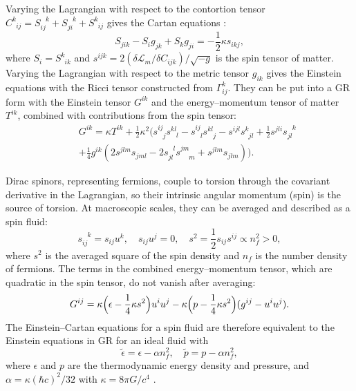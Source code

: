 \documentclass[prd,onecolumn,nofootinbib]{revtex4}
\begin{document}
Varying the Lagrangian with respect to the contortion tensor $C^k_{\phantom{k}ij}=S_{ij}^{\phantom{ij}k}+S_{ji}^{\phantom{ji}k}+S^k_{\phantom{k}ij}$ gives the Cartan equations \cite{EC}:
\[
    S_{jik}-S_i g_{jk}+S_k g_{ji}=-\frac{1}{2}\kappa s_{ikj},
\]
where $S_i=S^k_{\phantom{k}ik}$ and $s^{ijk}=2(\delta\mathcal{L}_m/\delta C_{ijk})/\sqrt{-g}$ is the spin tensor of matter.
Varying the Lagrangian with respect to the metric tensor $g_{ik}$ gives the Einstein equations with the Ricci tensor constructed from $\Gamma^{k}_{ij}$.
They can be put into a GR form with the Einstein tensor $G^{ik}$ and the energy--momentum tensor of matter $T^{ik}$, combined with contributions from the spin tensor:
\begin{eqnarray}
    & & G^{ik}=\kappa T^{ik}+\frac{1}{2}\kappa^2\biggl(s^{ij}_{\phantom{ij}j}s^{kl}_{\phantom{kl}l}-s^{ij}_{\phantom{ij}l}s^{kl}_{\phantom{kl}j}-s^{ijl}s^k_{\phantom{k}jl}+\frac{1}{2}s^{jli}s_{jl}^{\phantom{jl}k} \nonumber \\
    & & +\frac{1}{4}g^{ik}(2s^{jlm}s_{jml}-2s_{jl}^{\phantom{jl}l}s^{jm}_{\phantom{jm}m}+s^{jlm}s_{jlm})\biggr).
    \nonumber
\end{eqnarray}

Dirac spinors, representing fermions, couple to torsion through the covariant derivative in the Lagrangian, so their intrinsic angular momentum (spin) is the source of torsion.
At macroscopic scales, they can be averaged and described as a spin fluid:
\[
    s_{ij}^{\phantom{ij}k}=s_{ij}u^k,\quad s_{ij}u^j=0,\quad s^2=\frac{1}{2}s_{ij}s^{ij}\propto n_f^2>0,
\]
where $s^2$ is the averaged square of the spin density and $n_f$ is the number density of fermions.
The terms in the combined energy--momentum tensor, which are quadratic in the spin tensor, do not vanish after averaging:
\[
    G^{ij}=\kappa\Bigl(\epsilon-\frac{1}{4}\kappa s^2\Bigr)u^i u^j-\kappa\Bigl(p-\frac{1}{4}\kappa s^2\Bigr)(g^{ij}-u^i u^j).
\]
The Einstein--Cartan equations for a spin fluid are therefore equivalent to the Einstein equations in GR for an ideal fluid with
\begin{equation}
    \tilde{\epsilon}=\epsilon-\alpha n_f^2,\quad\tilde{p}=p-\alpha n_f^2,
    \label{fluid}
\end{equation}
where $\epsilon$ and $p$ are the thermodynamic energy density and pressure, and $\alpha=\kappa(\hbar c)^2/32$ with $\kappa=8\pi G/c^4$ \cite{iso,ApJ,Gabe}.\\
\end{document}

